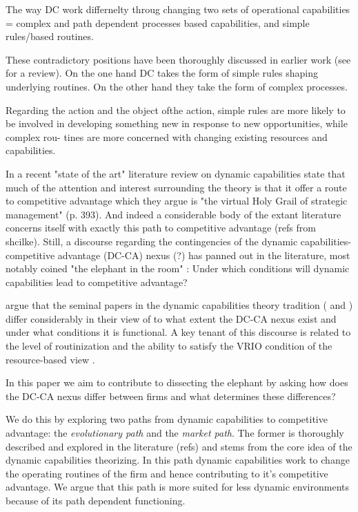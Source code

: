 \documentclass[review,fleqn]{elsarticle}\usepackage[]{graphicx}\usepackage[]{color}
\begin{document}
The way DC work differnelty throug changing two sets of operational capabilities = complex
and path dependent processes based capabilities, and simple rules/based routines. 

These contradictory positions have been thoroughly discussed in earlier work (see
\cite{Peteraf2013} for a review). On the one hand DC takes the form of simple rules
shaping underlying routines. On the other hand they take the form of complex processes.  

Regarding the action and the object ofthe action, simple rules are more likely to be
involved in developing something new in response to new opportunities, while complex
rou- tines are more concerned with changing existing resources and capabilities.

In a recent "state of the art" literature review on dynamic capabilities
\cite{Schilke2018} state that much of the attention and interest surrounding the theory is
that it offer a route to competitive advantage which they argue is "the virtual Holy Grail
of strategic management" (p. 393). And indeed a considerable body of the extant literature
concerns itself with exactly this path to competitive advantage (refs from
shcilke). Still, a discourse regarding the contingencies of the dynamic
capabilities-competitive advantage (DC-CA) nexus (?) has panned out in the literature,
most notably coined "the elephant in the room" \citep{Peteraf2013}: Under which conditions
will dynamic capabilities lead to competitive advantage?

\cite{Peteraf2013} argue that the seminal papers in the dynamic capabilities theory
tradition (\cite{Teece1997} and \cite{Eisenhardt2000}) differ considerably in their view
of to what extent the DC-CA nexus exist and under what conditions it is functional. A key
tenant of this discourse is related to the level of routinization and the ability to
satisfy the VRIO condition \citep{Barney1991a} of the resource-based view
\citep{Peteraf2013}.

In this paper we aim to contribute to dissecting the elephant by asking how does the DC-CA
nexus differ between firms and what determines these differences?

We do this by exploring two paths from dynamic capabilities to competitive advantage: the
\emph{evolutionary path} and the \emph{market path}. The former is thoroughly described
and explored in the literature (refs) and stems from the core idea of the dynamic
capabilities theorizing. In this path dynamic capabilities work to change the operating
routines of the firm and hence contributing to it's competitive advantage. We argue that
this path is more suited for less dynamic environments because of its path dependent
functioning.
\end{document}

